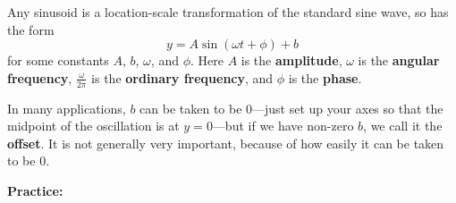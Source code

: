 \documentclass{article}
\begin{document}
Any sinusoid is a location-scale transformation of the standard sine wave, so has the form
\[y=A\sin(\omega t+\phi)+b\]
for some constants $A$, $b$, $\omega$, and $\phi$. Here $A$ is the \textbf{amplitude}, $\omega$ is the \textbf{angular frequency}, $\frac{\omega}{2\pi}$ is the \textbf{ordinary frequency}, and $\phi$ is the \textbf{phase}.

In many applications, $b$ can be taken to be 0---just set up your axes so that the midpoint of the oscillation is at $y=0$---but if we have non-zero $b$, we call it the \textbf{offset}. It is not generally very important, because of how easily it can be taken to be 0.



\clearpage

{\bf Practice:}

\vspace{5mm}
\end{document}
